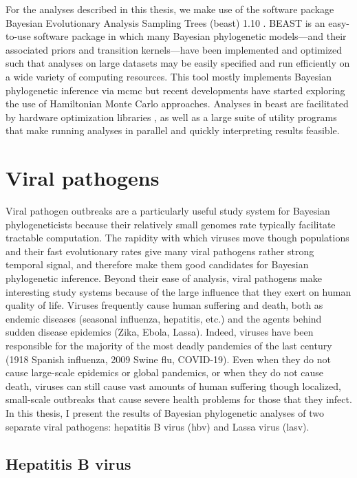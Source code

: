 For the analyses described in this thesis, we make use of the software package Bayesian Evolutionary Analysis Sampling Trees (\gls{beast}) 1.10 \cite{beast}.
BEAST is an easy-to-use software package in which many Bayesian phylogenetic models---and their associated priors and transition kernels---have been implemented and optimized such that analyses on large datasets may be easily specified and run efficiently on a wide variety of computing resources.
This tool mostly implements Bayesian phylogenetic inference via \gls{mcmc} but recent developments have started exploring the use of Hamiltonian Monte Carlo approaches.
Analyses in \gls{beast} are facilitated by hardware optimization libraries \cite{beagle}, as well as a large suite of utility programs that make running analyses in parallel and quickly interpreting results feasible.



\section{Viral pathogens}
Viral pathogen outbreaks are a particularly useful study system for Bayesian phylogeneticists because their relatively small genomes rate typically facilitate tractable computation.
The rapidity with which viruses move though populations and their fast evolutionary rates give many viral pathogens rather strong temporal signal, and therefore make them good candidates for Bayesian phylogenetic inference.
Beyond their ease of analysis, %
viral pathogens make interesting study systems because of the large influence that they exert on human quality of life.
Viruses frequently cause human suffering and death, both as endemic diseases (seasonal influenza, hepatitis, etc.) and the agents behind sudden disease epidemics (Zika, Ebola, Lassa).
Indeed, viruses have been responsible for the majority of the most deadly pandemics of the last century (1918 Spanish influenza, 2009 Swine flu, COVID-19).
Even when they do not cause large-scale epidemics or global pandemics, or when they do not cause death, viruses can still cause vast amounts of human suffering though localized, small-scale outbreaks that cause severe health problems for those that they infect.
In this thesis, I present the results of Bayesian phylogenetic analyses of two separate viral pathogens: hepatitis B virus (\gls{hbv}) and Lassa virus (\gls{lasv}).


\subsection{Hepatitis B virus}

